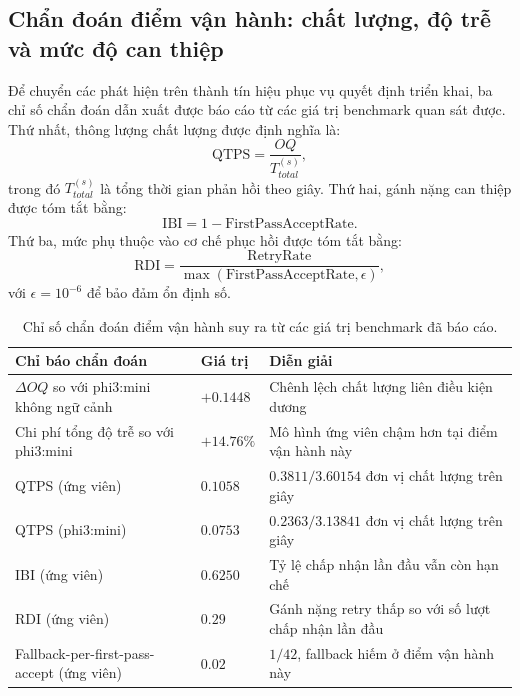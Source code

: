 ﻿\documentclass[a4paper,12pt]{article}
\begin{document}
\subsection{Chẩn đoán điểm vận hành: chất lượng, độ trễ và mức độ can thiệp}
Để chuyển các phát hiện trên thành tín hiệu phục vụ quyết định triển khai, ba chỉ số chẩn đoán dẫn xuất được báo cáo từ các giá trị benchmark quan sát được. Thứ nhất, thông lượng chất lượng được định nghĩa là:
\begin{equation}
\mathrm{QTPS}=\frac{OQ}{T_{total}^{(s)}},
\end{equation}
trong đó \(T_{total}^{(s)}\) là tổng thời gian phản hồi theo giây. Thứ hai, gánh nặng can thiệp được tóm tắt bằng:
\begin{equation}
\mathrm{IBI}=1-\mathrm{FirstPassAcceptRate}.
\end{equation}
Thứ ba, mức phụ thuộc vào cơ chế phục hồi được tóm tắt bằng:
\begin{equation}
\mathrm{RDI}=\frac{\mathrm{RetryRate}}{\max(\mathrm{FirstPassAcceptRate},\epsilon)},
\end{equation}
với \(\epsilon=10^{-6}\) để bảo đảm ổn định số.

\begin{table}[t]
\centering
\caption{Chỉ số chẩn đoán điểm vận hành suy ra từ các giá trị benchmark đã báo cáo.}
\label{tab:operating_point_diagnostics}
\begingroup
\footnotesize
\setlength{\tabcolsep}{4pt}
\begin{tabular}{p{}p{}p{}}
\toprule
Chỉ báo chẩn đoán & Giá trị & Diễn giải \\
\midrule
\(\Delta OQ\) so với phi3:mini không ngữ cảnh & \(+0.1448\) & Chênh lệch chất lượng liên điều kiện dương \\
Chi phí tổng độ trễ so với phi3:mini & \(+14.76\%\) & Mô hình ứng viên chậm hơn tại điểm vận hành này \\
QTPS (ứng viên) & \(0.1058\) & \(0.3811/3.60154\) đơn vị chất lượng trên giây \\
QTPS (phi3:mini) & \(0.0753\) & \(0.2363/3.13841\) đơn vị chất lượng trên giây \\
IBI (ứng viên) & \(0.6250\) & Tỷ lệ chấp nhận lần đầu vẫn còn hạn chế \\
RDI (ứng viên) & \(0.29\) & Gánh nặng retry thấp so với số lượt chấp nhận lần đầu \\
Fallback-per-first-pass-accept (ứng viên) & \(0.02\) & \(1/42\), fallback hiếm ở điểm vận hành này \\
\bottomrule
\end{tabular}
\endgroup
\end{table}
\end{document}
